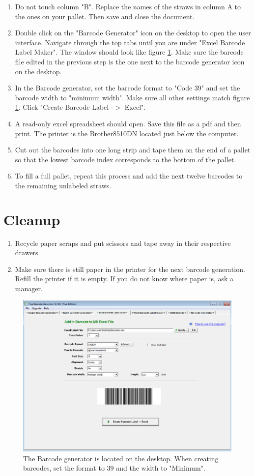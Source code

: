 \documentclass[letterpaper,12pt]{article}
\begin{document}
\begin{enumerate}
    \item Do not touch column "B". Replace the names of the straws in column A to the ones on your pallet.  Then save and close the document.
    \item Double click on the "Barcode Generator" icon on the desktop to open the user interface.  Navigate through the top tabs until you are under "Excel Barcode Label Maker".  The window should look like figure \ref{fig:dummy}.  Make sure the barcode file edited in the previous step is the one next to the barcode generator icon on the desktop.
    \item In the Barcode generator, set the barcode format to "Code 39" and set the barcode width to "minimum width".  Make sure all other settings match figure \ref{fig:dummy}.  Click "Create Barcode Label -$>$ Excel".
    \item A read-only excel spreadsheet should open.  Save this file as a pdf and then print.  The printer is the Brother8510DN located just below the computer.
     \item Cut out the barcodes into one long strip and tape them on the end of a pallet so that the lowest barcode index corresponds to the bottom of the pallet.
     \item To fill a full pallet, repeat this process and add the next twelve barcodes to the remaining unlabeled straws.
    \end{enumerate}
   
\section{Cleanup}
\begin{enumerate}
	\item Recycle paper scraps and put scissors and tape away in their respective drawers.
    \item Make sure there is still paper in the printer for the next barcode generation.  Refill the printer if it is empty.  If you do not know where paper is, ask a manager.

\end{enumerate}

 \begin{figure} [h]
		\centering
		\includegraphics[width=.75\textwidth]{BarcodeGeneratorSOP.png}
		\caption{The Barcode generator is located on the desktop.  When creating barcodes, set the format to 39 and the width to "Minimum".}
		\label{fig:dummy}
	\end{figure}
\end{document}
